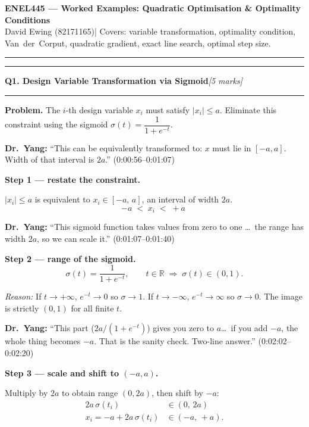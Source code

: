 \documentclass[10pt,a4paper]{article}
\newcommand{\sectitle}[2]{%
  \vspace{10pt}\noindent\rule{\linewidth}{0.8pt}\par\vspace{2pt}%
  {\large\textbf{#1}\hfill\normalsize\textit{[#2 marks]}}\par
  \vspace{2pt}\rule{\linewidth}{0.4pt}\vspace{4pt}}
\newcommand{\reason}[1]{%
  \begin{mdframed}[backgroundcolor=reasonbg, linewidth=0.4pt,
    innertopmargin=3pt, innerbottommargin=3pt,
    innerleftmargin=6pt, innerrightmargin=6pt]
    \small\textit{Reason:} \small #1
  \end{mdframed}\vspace{2pt}}
\newcommand{\lecnote}[1]{%
  \begin{mdframed}[backgroundcolor=notebg, linewidth=0.4pt,
    innertopmargin=3pt, innerbottommargin=3pt,
    innerleftmargin=6pt, innerrightmargin=6pt]
    \small\textbf{Dr.\ Yang:} \small #1
  \end{mdframed}\vspace{2pt}}
\begin{document}
\begin{center}
  {\large\textbf{ENEL445 --- Worked Examples: Quadratic Optimisation \& Optimality Conditions}}\\[3pt]
  {\small David Ewing (82171165)\quad|\quad
   Covers: variable transformation, optimality condition, Van~der~Corput,
   quadratic gradient, exact line search, optimal step size.}
\end{center}
\noindent\rule{\linewidth}{0.8pt}

\sectitle{Q1. Design Variable Transformation via Sigmoid}{5}

\noindent\textbf{Problem.} The $i$-th design variable $x_i$ must satisfy $|x_i|\le a$.
Eliminate this constraint using the sigmoid $\sigma(t)=\dfrac{1}{1+e^{-t}}$.

\vspace{6pt}
\lecnote{``This can be equivalently transformed to: $x$ must lie in $[-a,a]$.
         Width of that interval is $2a$.'' (0:00:56--0:01:07)}
\textbf{Step 1 --- restate the constraint.}

$|x_i|\le a$ is equivalent to $x_i\in[-a,\,a]$, an interval of width $2a$.
\[
  -a \;<\; x_i \;<\; +a \; 
\]


\lecnote{``This sigmoid function takes values from zero to one \ldots\ the range has
         width $2a$, so we can scale it.'' (0:01:07--0:01:40)}

\textbf{Step 2 --- range of the sigmoid.}
\[
  \sigma(t)=\frac{1}{1+e^{-t}},\qquad t\in\mathbb{R}\;\Rightarrow\;\sigma(t)\in(0,1).
\]

\reason{If $t\to+\infty$, $e^{-t}\to 0$ so $\sigma\to 1$.
        If $t\to-\infty$, $e^{-t}\to\infty$ so $\sigma\to 0$.
        The image is strictly $(0,1)$ for all finite $t$.}

\lecnote{``This part ($2a/(1+e^{-t})$) gives you zero to $a$\ldots\ if you add $-a$,
         the whole thing becomes $-a$. That is the sanity check.
         Two-line answer.'' (0:02:02--0:02:20)}

\textbf{Step 3 --- scale and shift to $(-a,a)$.}

Multiply by $2a$ to obtain range $(0,2a)$, then shift by $-a$:
\begin{align*}
  2a\,\sigma(t_i)             &\in (0,\,2a) \\
  x_i = -a + 2a\,\sigma(t_i) &\in (-a,\,+a).
\end{align*}
\end{document}
